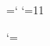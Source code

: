 












\chardef\atcode=\catcode`\@	%
\catcode`\@=11			%

\let\@acci=\'
\let\@accii=\`
\let\@acciii=\=

\catcode`\@=\atcode		%




